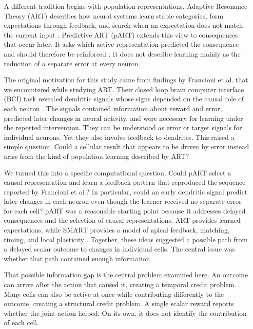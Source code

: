 \documentclass[11pt]{article}
\begin{document}
A different tradition begins with population representations. Adaptive Resonance Theory (ART) describes how neural systems learn stable categories, form expectations through feedback, and search when an expectation does not match the current input \citep{carpenter1987}. Predictive ART (pART) extends this view to consequences that occur later. It asks which active representation predicted the consequence and should therefore be reinforced \citep{grossberg2018}. It does not describe learning mainly as the reduction of a separate error at every neuron.

The original motivation for this study came from findings by Francioni et al. that we encountered while studying ART. Their closed loop brain computer interface (BCI) task revealed dendritic signals whose signs depended on the causal role of each neuron \citep{francioni2026}. The signals contained information about reward and error, predicted later changes in neural activity, and were necessary for learning under the reported intervention. They can be understood as error or target signals for individual neurons. Yet they also involve feedback to dendrites. This raised a simple question. Could a cellular result that appears to be driven by error instead arise from the kind of population learning described by ART?

We turned this into a specific computational question. Could pART select a causal representation and learn a feedback pattern that reproduced the sequence reported by Francioni et al.? In particular, could an early dendritic signal predict later changes in each neuron even though the learner received no separate error for each cell? pART was a reasonable starting point because it addresses delayed consequences and the selection of causal representations. ART provides learned expectations, while SMART provides a model of apical feedback, matching, timing, and local plasticity \citep{grossbergversace2008}. Together, these ideas suggested a possible path from a delayed scalar outcome to changes in individual cells. The central issue was whether that path contained enough information.

That possible information gap is the central problem examined here. An outcome can arrive after the action that caused it, creating a temporal credit problem. Many cells can also be active at once while contributing differently to the outcome, creating a structural credit problem. A single scalar reward reports whether the joint action helped. On its own, it does not identify the contribution of each cell.
\end{document}
